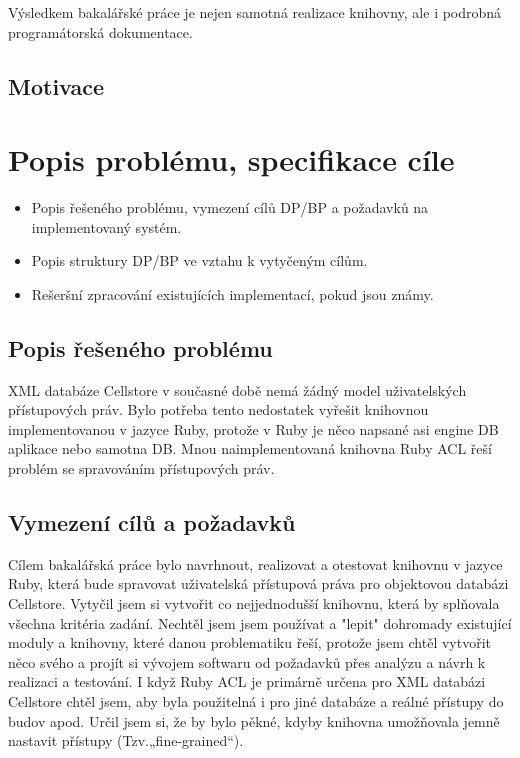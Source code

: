 \documentclass[11pt,twoside,a4paper]{book}
\begin{document}
Výsledkem bakalářské práce je nejen samotná realizace knihovny, ale i podrobná programátorská dokumentace.

\section{Motivace}



\chapter{Popis problému, specifikace cíle}

\begin{itemize}
\item Popis řešeného problému, vymezení cílů DP/BP a požadavků na implementovaný systém.
\item Popis struktury DP/BP ve vztahu k vytyčeným cílům.
\item Rešeršní zpracování existujících implementací, pokud jsou známy.
\end{itemize}

\section{Popis řešeného problému}

XML databáze Cellstore v současné době nemá žádný model uživatelských přístupových práv. Bylo potřeba tento nedostatek vyřešit knihovnou implementovanou v jazyce Ruby, protože v Ruby je něco napsané asi engine DB aplikace nebo samotna DB. Mnou naimplementovaná knihovna Ruby ACL řeší problém se spravováním přístupových práv.

\section{Vymezení cílů a požadavků}
Cílem bakalářská práce bylo navrhnout, realizovat a otestovat knihovnu v jazyce Ruby, která bude spravovat uživatelská přístupová práva pro objektovou databázi Cellstore.
Vytyčil jsem si vytvořit co nejjednodušší knihovnu, která by splňovala všechna kritéria zadání. Nechtěl jsem jsem používat a "lepit" dohromady existující moduly a knihovny, které danou problematiku řeší, protože jsem chtěl vytvořit něco svého a projít si vývojem softwaru od požadavků přes analýzu a návrh k realizaci a testování. 
I když Ruby ACL je primárně určena pro XML databázi Cellstore chtěl jsem, aby byla použitelná i pro jiné databáze a reálné přístupy do budov apod.
Určil jsem si, že by bylo pěkné, kdyby knihovna umožňovala jemně nastavit přístupy (Tzv.„fine-grained“).
\end{document}
